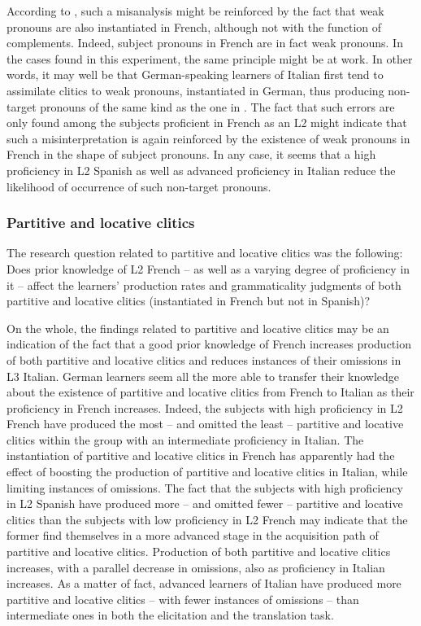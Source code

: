 \documentclass[output=paper,modfonts,nonflat,newtxmath]{langsci/langscibook}
\begin{document}
According to \citet{HamannBelletti2006}, such a misanalysis might be reinforced by the fact that weak pronouns are also instantiated in French, although not with the function of complements. Indeed, subject pronouns in French are in fact weak pronouns. In the cases found in this experiment, the same principle might be at work. In other words, it may well be that German-speaking learners of Italian first tend to assimilate clitics to weak pronouns, instantiated in German, thus producing non-target pronouns of the same kind as the one in . The fact that such errors are only found among the subjects proficient in French as an L2 might indicate that such a misinterpretation is again reinforced by the existence of weak pronouns in French in the shape of subject pronouns. In any case, it seems that a high proficiency in L2 Spanish as well as advanced proficiency in Italian reduce the likelihood of occurrence of such non-target pronouns.

\subsubsection{Partitive and locative clitics} %

The research question related to partitive and locative clitics was the following: Does prior knowledge of L2 French – as well as a varying degree of proficiency in it – affect the learners’ production rates and grammaticality judgments of both partitive and locative clitics (instantiated in French but not in Spanish)?

On the whole, the findings related to partitive and locative clitics may be an indication of the fact that a good prior knowledge of French increases production of both partitive and locative clitics and reduces instances of their omissions in L3 Italian. German learners seem all the more able to transfer their knowledge about the existence of partitive and locative clitics from French to Italian as their proficiency in French increases. Indeed, the subjects with high proficiency in L2 French have produced the most – and omitted the least – partitive and locative clitics within the group with an intermediate proficiency in Italian. The instantiation of partitive and locative clitics in French has apparently had the effect of boosting the production of partitive and locative clitics in Italian, while limiting instances of omissions. The fact that the subjects with high proficiency in L2 Spanish have produced more – and omitted fewer – partitive and locative clitics than the subjects with low proficiency in L2 French may indicate that the former find themselves in a more advanced stage in the acquisition path of partitive and locative clitics. Production of both partitive and locative clitics increases, with a parallel decrease in omissions, also as proficiency in Italian increases. As a matter of fact, advanced learners of Italian have produced more partitive and locative clitics – with fewer instances of omissions – than intermediate ones in both the elicitation and the translation task.
\end{document}
